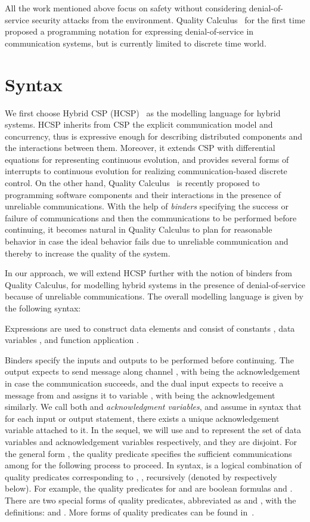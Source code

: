 \documentclass{llncs}
\begin{document}
All the work mentioned above focus on safety without considering denial-of-service security attacks from
the environment.
Quality Calculus~\cite{RNV12,HNN13} for the first time proposed a programming notation for expressing
denial-of-service in communication systems, but is currently limited to discrete time world.



\section{Syntax}
\label{sec:syntax}
 We first choose Hybrid CSP (HCSP)~\cite{Jifeng:1994,Zhou:1996} as the modelling language
 for hybrid systems.
 HCSP inherits from CSP the explicit communication model and concurrency, thus is expressive enough for describing
  distributed components and the interactions between them. Moreover, it extends CSP with differential
equations for representing continuous evolution, and provides several forms of interrupts to continuous evolution for
realizing communication-based discrete control.
On the other hand, Quality Calculus~\cite{RNV12,HNN13} is recently proposed to programming software components and their interactions in the presence
of unreliable communications. With the help of  \emph{binders} specifying the success or failure of communications and then the
communications to be performed before continuing,
it becomes natural in Quality Calculus to plan for reasonable behavior  in case the ideal
behavior fails due to unreliable communication and thereby to increase the quality of  the system.

In our approach, we will extend HCSP further with the notion of binders from Quality Calculus,
for modelling hybrid systems in the presence of denial-of-service because of unreliable communications.
The overall modelling language is given by the following syntax:
\vspace{-0.5em}
 

Expressions  are used to construct data elements and consist of constants ,
data variables , and function application .

Binders  specify the inputs and outputs to be performed before continuing.
The output   expects to send message  along channel , with
 being the acknowledgement in case the communication succeeds, and the
dual input  expects to receive a message from  and assigns it to variable , with
  being the acknowledgement similarly. We call both  and  \emph{acknowledgment variables}, and
assume in syntax that for each input or output statement, there exists a unique acknowledgement variable attached to it.
In the sequel, we will
use  and  to represent the set of data variables and acknowledgement variables respectively,
 and they are disjoint.
For the general form , the quality predicate  specifies the sufficient communications
among
   for the following process to proceed. In syntax,  is a logical
combination of quality predicates corresponding to , ,  recursively (denoted by  respectively below).
For example, the quality predicates for  and
 are boolean formulas  and .
There are two special forms of quality predicates, abbreviated as  and , with the definitions:
 and .
More forms of quality predicates can be found in~\cite{RNV12}.
\end{document}
